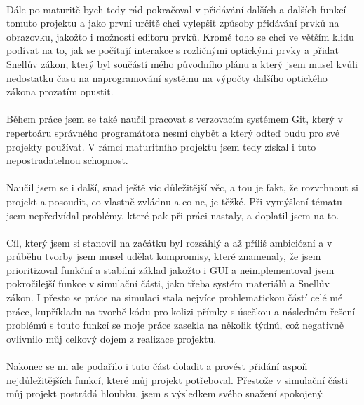 \documentclass[12pt,a4paper]{report}
\begin{document}
\paragraph{} Dále po maturitě bych tedy rád pokračoval v přidávání dalších a dalších funkcí tomuto projektu a jako první určitě chci vylepšit způsoby přidávání prvků na obrazovku, jakožto i možnosti editoru prvků. Kromě toho se chci ve větším klidu podívat na to, jak se počítají interakce s rozličnými optickými prvky a přidat Snellův zákon, který byl součástí mého původního plánu a který jsem musel kvůli nedostatku času na naprogramování systému na výpočty dalšího optického zákona prozatím opustit.
\enlargethispage{1\baselineskip}
\paragraph{} Během práce jsem se také naučil pracovat s verzovacím systémem Git, který v repertoáru správného programátora nesmí chybět a který odteď budu pro své projekty používat. V rámci maturitního projektu jsem tedy získal i tuto nepostradatelnou schopnost.
\paragraph{} Naučil jsem se i další, snad ještě víc důležitější věc, a tou je fakt, že rozvrhnout si projekt a posoudit, co vlastně zvládnu a co ne, je těžké. Při vymýšlení tématu jsem nepředvídal problémy, které pak při práci nastaly, a doplatil jsem na to.
\paragraph{} Cíl, který jsem si stanovil na začátku byl rozsáhlý a až příliš ambiciózní a v průběhu tvorby jsem musel udělat kompromisy, které znamenaly, že jsem prioritizoval funkční a stabilní základ jakožto i GUI a neimplementoval jsem pokročilejší funkce v simulační části, jako třeba systém materiálů a Snellův zákon. I přesto se práce na simulaci stala nejvíce problematickou částí celé mé práce, kupříkladu na tvorbě kódu pro kolizi přímky s úsečkou a následném řešení problémů s touto funkcí se moje práce zasekla na několik týdnů, což negativně ovlivnilo můj celkový dojem z realizace projektu.
\paragraph{} Nakonec se mi ale podařilo i tuto část doladit a provést přidání aspoň nejdůležitějších funkcí, které můj projekt potřeboval. Přestože v simulační části můj projekt postrádá hloubku, jsem s výsledkem svého snažení spokojený.
\end{document}
